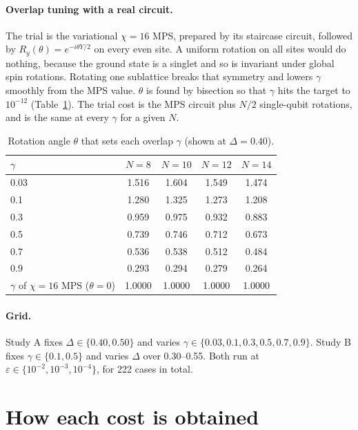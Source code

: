 \documentclass[10pt]{article}
\begin{document}
\paragraph{Overlap tuning with a real circuit.} The trial is the variational $\chi=16$ MPS, prepared by its
staircase circuit, followed by $R_y(\theta)=e^{-i\theta Y/2}$ on every even site. A uniform rotation on all sites
would do nothing, because the ground state is a singlet and so is invariant under global spin rotations. Rotating
one sublattice breaks that symmetry and lowers $\gamma$ smoothly from the MPS value. $\theta$ is found by
bisection so that $\gamma$ hits the target to $10^{-12}$ (Table~\ref{tab:theta}). The trial cost is the MPS circuit
plus $N/2$ single-qubit rotations, and is the same at every $\gamma$ for a given $N$.

\begin{table}[h]\centering\small
\caption{Rotation angle $\theta$ that sets each overlap $\gamma$ (shown at $\Delta=0.40$).}\label{tab:theta}
\begin{tabular}{lcccc}\toprule
$\gamma$ & $N=8$ & $N=10$ & $N=12$ & $N=14$ \\\midrule
0.03 & 1.516 & 1.604 & 1.549 & 1.474 \\
0.1 & 1.280 & 1.325 & 1.273 & 1.208 \\
0.3 & 0.959 & 0.975 & 0.932 & 0.883 \\
0.5 & 0.739 & 0.746 & 0.712 & 0.673 \\
0.7 & 0.536 & 0.538 & 0.512 & 0.484 \\
0.9 & 0.293 & 0.294 & 0.279 & 0.264 \\
\midrule
$\gamma$ of $\chi=16$ MPS ($\theta=0$) & 1.0000 & 1.0000 & 1.0000 & 1.0000 \\
\bottomrule\end{tabular}
\end{table}

\paragraph{Grid.} Study A fixes $\Delta\in\{0.40,0.50\}$ and varies $\gamma\in\{0.03,0.1,0.3,0.5,0.7,0.9\}$.
Study B fixes $\gamma\in\{0.1,0.5\}$ and varies $\Delta$ over 0.30--0.55. Both run at
$\varepsilon\in\{10^{-2},10^{-3},10^{-4}\}$, for 222 cases in total.

\section{How each cost is obtained}
\end{document}
